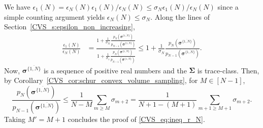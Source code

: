 \documentclass[twoside,11pt]{book}
\numberwithin{theorem}{chapter}
\numberwithin{definition}{chapter}
\numberwithin{proposition}{chapter}
\numberwithin{corollary}{chapter}
\numberwithin{example}{chapter}
\numberwithin{lemma}{chapter}
\numberwithin{assumption}{chapter}
\begin{document}
We have
$\epsilon_{1}(N) = \epsilon_{N}(N)\epsilon_{1}(N)/\epsilon_{N}(N) \leq \sigma_{N} \epsilon_{1}(N)/\epsilon_{N}(N)$ since a simple counting argument yields $ \epsilon_{N}(N) \leq \sigma_{N}$.
Along the lines of Section~\ref{CVS_s:epsilon_non_increasing},
\begin{align}
\frac{\epsilon_{1}(N)}{\epsilon_{N}(N)} & = \frac{1  + \frac{1}{\sigma_{N}}\frac{p_{N} \left(\bm{\sigma}^{\overline{\{1,N \}}} \right) }{ p_{N-1} \left(\bm{\sigma}^{\overline{\{1,N \}}} \right)} }{1  + \frac{1}{\sigma_{1} }\frac{p_{N} \left(\bm{\sigma}^{\overline{\{1,N \}}} \right) }{p_{N-1} \left(\bm{\sigma}^{\overline{\{1,N \}}} \right)}}
\leq 1  + \frac{1}{\sigma_{N}}\frac{p_{N} \left(\bm{\sigma}^{\overline{\{1,N \}}} \right) }{ p_{N-1} \left(\bm{\sigma}^{\overline{\{1,N \}}} \right)}.
\end{align}
Now, $\bm{\sigma}^{\overline{\{1,N \}}}$ is a sequence of positive real numbers and the $\bm{\Sigma}$ is trace-class. Then, by Corollary~\ref{CVS_cor:schur_convex_volume_sampling}, for $M \in [N-1]$,
\begin{equation}
\frac{p_{N} \left(\bm{\sigma}^{\overline{\{1,N \}}}  \right) }{ p_{N-1} \left(\bm{\sigma}^{\overline{\{1,N \}}}  \right)} \leq \frac{1 }{N-M} \sum_{ m \geq M} \sigma_{m+2} = \frac{1 }{N+1-(M+1)} \sum_{ m+1 \geq M+1} \sigma_{m+2}.
\end{equation}
Taking $M'= M+1$ concludes the proof of \eqref{CVS_eq:ineq_r_N}.


\end{document}
